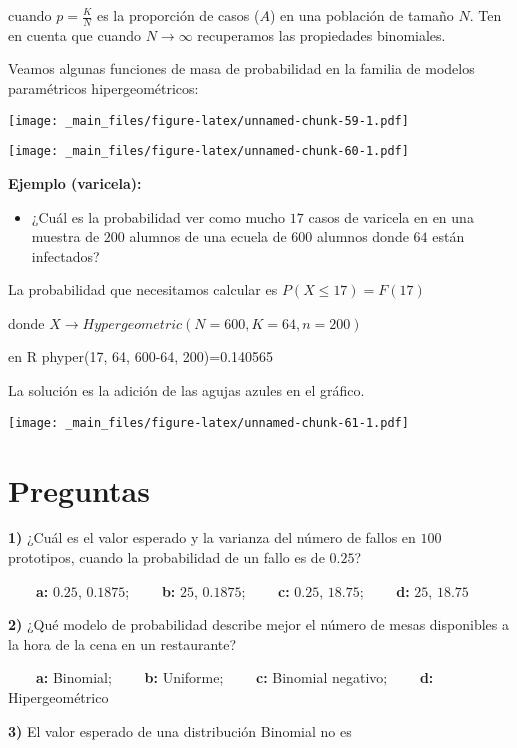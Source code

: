\documentclass[
]{book}
\providecommand{\tightlist}{%
  \setlength{\itemsep}{0pt}\setlength{\parskip}{0pt}}
\begin{document}
cuando \(p=\frac{K}{N}\) es la proporción de casos (\(A\)) en una población de tamaño \(N\). Ten en cuenta que cuando \(N \rightarrow \infty\) recuperamos las propiedades binomiales.

Veamos algunas funciones de masa de probabilidad en la familia de modelos paramétricos hipergeométricos:

\texttt{[image: \_main\_files/figure-latex/unnamed-chunk-59-1.pdf]}

\texttt{[image: \_main\_files/figure-latex/unnamed-chunk-60-1.pdf]}

\textbf{Ejemplo (varicela):}

\begin{itemize}
\tightlist
\item
  ¿Cuál es la probabilidad ver como mucho \(17\) casos de varicela en en una muestra de \(200\) alumnos de una ecuela de \(600\) alumnos donde \(64\) están infectados?
\end{itemize}

La probabilidad que necesitamos calcular es
\(P(X \leq 17)=F(17)\)

donde \(X \rightarrow Hypergeometric(N=600,K=64,n=200)\)

en R phyper(17, 64, 600-64, 200)=0.140565

La solución es la adición de las agujas azules en el gráfico.

\texttt{[image: \_main\_files/figure-latex/unnamed-chunk-61-1.pdf]}

\hypertarget{preguntas-4}{%
\section{Preguntas}\label{preguntas-4}}

\textbf{1)} ¿Cuál es el valor esperado y la varianza del número de fallos en \(100\) prototipos, cuando la probabilidad de un fallo es de \(0.25\)?

\textbf{\(\qquad\)a:} \(0.25\), \(0.1875\);
\textbf{\(\qquad\)b:} \(25\), \(0.1875\);
\textbf{\(\qquad\)c:} \(0.25\), \(18.75\);
\textbf{\(\qquad\)d:} \(25\), \(18.75\)

\textbf{2)} ¿Qué modelo de probabilidad describe mejor el número de mesas disponibles a la hora de la cena en un restaurante?

\textbf{\(\qquad\)a:} Binomial;
\textbf{\(\qquad\)b:} Uniforme;
\textbf{\(\qquad\)c:} Binomial negativo;
\textbf{\(\qquad\)d:} Hipergeométrico

\textbf{3)} El valor esperado de una distribución Binomial no es
\end{document}
